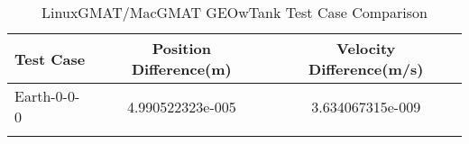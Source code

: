 \begin{table}[htbp!]
\centering
\caption{ LinuxGMAT/MacGMAT GEOwTank Test Case Comparison}
      \begin{tabular}{lcc}
      \hline\hline
          Test Case & Position Difference(m) & Velocity Difference(m/s) \\
         \hline
         Earth-0-0-0 & 4.990522323e-005 & 3.634067315e-009 \\
      \hline\hline
      \label{Table: GEOwTank LinuxGMAT-MacGMAT Table} 
\end{tabular}
\end{table}
